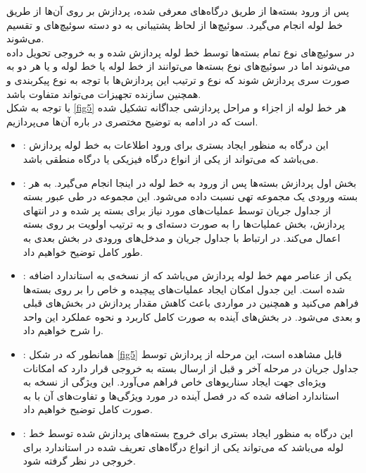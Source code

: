 پس از ورود بسته‌ها از طریق درگاه‌های معرفی شده، پردازش بر روی آن‌ها از طریق خط لوله انجام می‌گیرد. سوئیچ‌ها از لحاظ پشتیبانی  به دو دسته سوئیچ‌های  و  تقسیم می‌شوند.\\
در سوئیچ‌های نوع  تمام بسته‌ها توسط خط لوله  پردازش شده و به خروجی تحویل داده می‌شوند اما در سوئیچ‌های نوع  بسته‌ها می‌توانند از خط لوله  یا خط لوله  و یا هر دو به صورت سری پردازش شوند که نوع و ترتیب این پردازش‌ها با توجه به نوع پیکربندی و همچنین سازنده تجهیزات می‌تواند متفاوت باشد.\\
با توجه به شکل \ref{fig5} هر خط لوله از اجزاء و مراحل پردازشی جداگانه تشکیل شده است که در ادامه به توضیح مختصری در باره آن‌ها می‌پردازیم. 
\begin{itemize}
	\item {}:
این درگاه به منظور ایجاد بستری برای ورود اطلاعات به خط لوله پردازش می‌باشد که می‌تواند از یکی از انواع درگاه فیزیکی یا درگاه منطقی باشد.

	\item {}:
بخش اول پردازش بسته‌ها پس از ورود به خط لوله در اینجا انجام می‌گیرد. به هر بسته ورودی یک مجموعه تهی  نسبت داده می‌شود. این مجموعه در طی عبور بسته از جداول جریان توسط عملیات‌های مورد نیاز برای بسته پر شده و در انتهای پردازش، بخش  عملیات‌ها را به صورت دسته‌ای و به ترتیب اولویت بر روی بسته اعمال می‌کند. در ارتباط با جداول جریان و مدخل‌های ورودی در بخش بعدی به طور کامل توضیح خواهیم داد.

	\item {}:
یکی از عناصر مهم خط لوله پردازش می‌باشد که از نسخه‌ی  به استاندارد اضافه شده است. این جدول امکان ایجاد عملیات‌های پیچیده و خاص را بر روی بسته‌ها فراهم می‌کنید و همچنین در مواردی باعث کاهش مقدار پردازش در بخش‌های قبلی و بعدی می‌شود. در بخش‌های آینده به صورت کامل کاربرد و نحوه عملکرد این واحد را شرح خواهیم داد.

	\item {}:
همانطور که در شکل \ref{fig5} قابل مشاهده است، این مرحله از پردازش توسط جداول جریان در مرحله آخر و قبل از ارسال بسته به خروجی قرار دارد که امکانات ویژه‌ای جهت ایجاد سناریو‌های خاص فراهم می‌آورد. این ویژگی از نسخه  به استاندارد اضافه شده که در فصل آینده در مورد ویژگی‌ها و تفاوت‌های آن با  به صورت کامل توضیح خواهیم داد.

	\item {}:
این درگاه به منظور ایجاد بستری برای خروج بسته‌های پردازش شده توسط خط لوله می‌باشد که می‌تواند یکی از انواع درگاه‌های تعریف شده در استاندارد برای خروجی در نظر گرفته شود.

\end{itemize}


